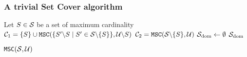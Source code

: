 \begin{frame}\frametitle{A trivial Set Cover algorithm}
\begin{algorithm}[H]\footnotesize
Let $S \in {\cal{S}}$ be a set of maximum cardinality\;
${\cal{C}}_1 = \{S\}\cup {\tt MSC}(\{S'\backslash S \mid S' \in{\cal S}\backslash \{S\}\}, {\cal U}\backslash S )$\;
${\cal{C}}_2 = {\tt MSC}({\cal S}\backslash \{S\},{\cal U})$\;
${\cal S}_{\rm dom} \leftarrow \emptyset$\;
\Return ${\cal S}_{\rm dom}$\;
\caption{{\tt MSC}$({\cal S,U})$}
\end{algorithm}
\end{frame}